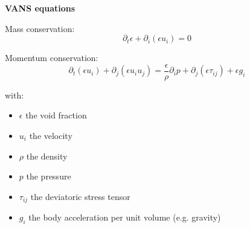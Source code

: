 \documentclass[c,11pt,xcolor=dvipsnames, aspectratio=169]{beamer}
\begin{document}
\begin{frame}{\textbf{VANS equations}}
\begin{block}{Mass conservation:}
\[
\partial_t \epsilon + \partial_i (\epsilon u_i) = 0
\]
\end{block}

\begin{block}{Momentum conservation:}
	\[
	\partial_t \left(\epsilon u_i\right) + \partial_j (\epsilon u_i u_j) = \frac{\epsilon}{\rho} \partial_i p + \partial_j \left(\epsilon \tau_{ij}\right) + \epsilon g_i
	\]
	\end{block}

	with:
	\begin{itemize}
	\item $\epsilon$ the void fraction
	\item $u_i$ the velocity
	\item $\rho$ the density
	\item $p$ the pressure
	\item $\tau_{ij}$ the deviatoric stress tensor
	\item $g_i$ the body acceleration per unit volume (e.g. gravity)
	\end{itemize} 


\end{frame}
\end{document}

